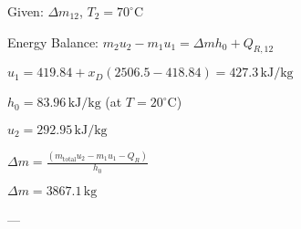 Given: \( \Delta m_{12} \), \( T_2 = 70^\circ \text{C} \)  

Energy Balance:  
\( m_2 u_2 - m_1 u_1 = \Delta m h_0 + Q_{R,12} \)  

\( u_1 = 419.84 + x_D (2506.5 - 418.84) = 427.3 \, \text{kJ/kg} \)  

\( h_0 = 83.96 \, \text{kJ/kg} \) (at \( T = 20^\circ \text{C} \))  

\( u_2 = 292.95 \, \text{kJ/kg} \)  

\( \Delta m = \frac{(m_{\text{total}} u_2 - m_1 u_1 - Q_R)}{h_0} \)  

\( \Delta m = 3867.1 \, \text{kg} \)  

---